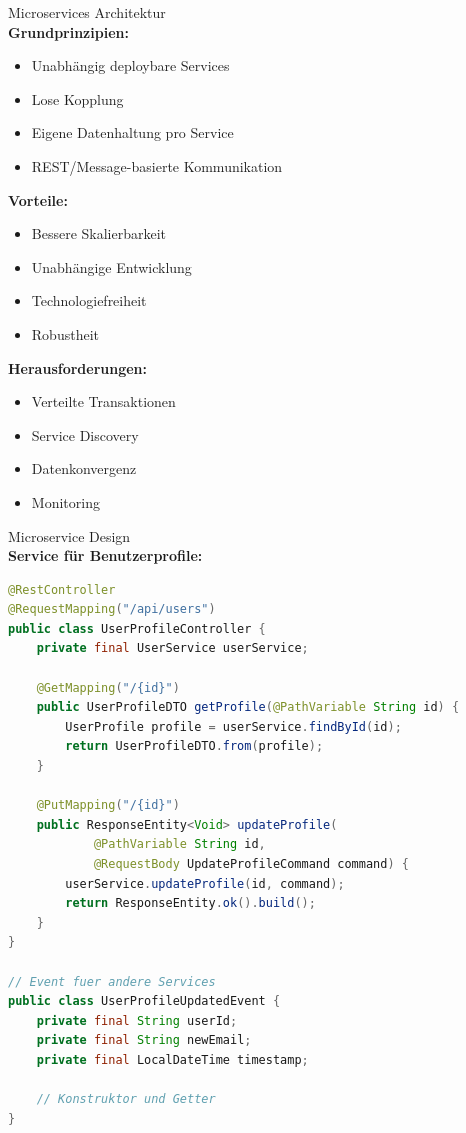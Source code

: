 \begin{concept}{Microservices Architektur}\\
\textbf{Grundprinzipien:}
\begin{itemize}
    \item Unabhängig deploybare Services
    \item Lose Kopplung
    \item Eigene Datenhaltung pro Service
    \item REST/Message-basierte Kommunikation
\end{itemize}

\textbf{Vorteile:}
\begin{itemize}
    \item Bessere Skalierbarkeit
    \item Unabhängige Entwicklung
    \item Technologiefreiheit
    \item Robustheit
\end{itemize}

\textbf{Herausforderungen:}
\begin{itemize}
    \item Verteilte Transaktionen
    \item Service Discovery
    \item Datenkonvergenz
    \item Monitoring
\end{itemize}
\end{concept}

\begin{example2}{Microservice Design}\\
\textbf{Service für Benutzerprofile:}

\begin{lstlisting}[language=Java, style=basesmol]
@RestController
@RequestMapping("/api/users")
public class UserProfileController {
    private final UserService userService;
    
    @GetMapping("/{id}")
    public UserProfileDTO getProfile(@PathVariable String id) {
        UserProfile profile = userService.findById(id);
        return UserProfileDTO.from(profile);
    }
    
    @PutMapping("/{id}")
    public ResponseEntity<Void> updateProfile(
            @PathVariable String id, 
            @RequestBody UpdateProfileCommand command) {
        userService.updateProfile(id, command);
        return ResponseEntity.ok().build();
    }
}

// Event fuer andere Services
public class UserProfileUpdatedEvent {
    private final String userId;
    private final String newEmail;
    private final LocalDateTime timestamp;
    
    // Konstruktor und Getter
}
\end{lstlisting}
\end{example2}

